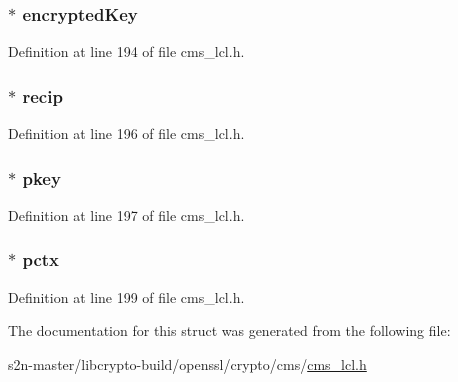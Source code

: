 \subsubsection[{\texorpdfstring{encrypted\+Key}{encryptedKey}}]{$\ast$ encrypted\+Key}\hypertarget{struct_c_m_s___key_trans_recipient_info__st_a683d211b1506ecf342fb4d35a34aed33}{}\label{struct_c_m_s___key_trans_recipient_info__st_a683d211b1506ecf342fb4d35a34aed33}


Definition at line 194 of file cms\+\_\+lcl.\+h.

\subsubsection[{\texorpdfstring{recip}{recip}}]{$\ast$ recip}\hypertarget{struct_c_m_s___key_trans_recipient_info__st_a9f1acebd072920ce93198557bb50e123}{}\label{struct_c_m_s___key_trans_recipient_info__st_a9f1acebd072920ce93198557bb50e123}


Definition at line 196 of file cms\+\_\+lcl.\+h.

\subsubsection[{\texorpdfstring{pkey}{pkey}}]{$\ast$ pkey}\hypertarget{struct_c_m_s___key_trans_recipient_info__st_a76a3c5d8ec8f468075eb3e366a35a83c}{}\label{struct_c_m_s___key_trans_recipient_info__st_a76a3c5d8ec8f468075eb3e366a35a83c}


Definition at line 197 of file cms\+\_\+lcl.\+h.

\subsubsection[{\texorpdfstring{pctx}{pctx}}]{$\ast$ pctx}\hypertarget{struct_c_m_s___key_trans_recipient_info__st_a948d2b6093ada6d39976bf4970cd2959}{}\label{struct_c_m_s___key_trans_recipient_info__st_a948d2b6093ada6d39976bf4970cd2959}


Definition at line 199 of file cms\+\_\+lcl.\+h.



The documentation for this struct was generated from the following file\+:\begin{DoxyCompactItemize}
\item 
s2n-\/master/libcrypto-\/build/openssl/crypto/cms/\hyperlink{cms__lcl_8h}{cms\+\_\+lcl.\+h}\end{DoxyCompactItemize}

